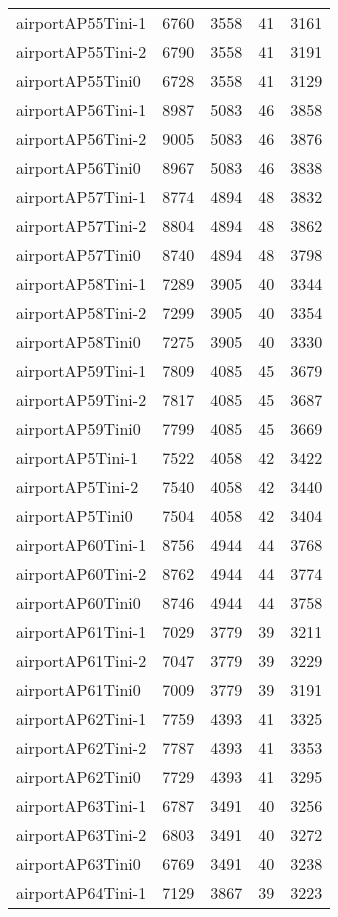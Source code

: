 \begin{longtable}{lrrrr}
airportAP55Tini-1 & 6760 & 3558 & 41 & 3161 \\
airportAP55Tini-2 & 6790 & 3558 & 41 & 3191 \\
airportAP55Tini0 & 6728 & 3558 & 41 & 3129 \\
airportAP56Tini-1 & 8987 & 5083 & 46 & 3858 \\
airportAP56Tini-2 & 9005 & 5083 & 46 & 3876 \\
airportAP56Tini0 & 8967 & 5083 & 46 & 3838 \\
airportAP57Tini-1 & 8774 & 4894 & 48 & 3832 \\
airportAP57Tini-2 & 8804 & 4894 & 48 & 3862 \\
airportAP57Tini0 & 8740 & 4894 & 48 & 3798 \\
airportAP58Tini-1 & 7289 & 3905 & 40 & 3344 \\
airportAP58Tini-2 & 7299 & 3905 & 40 & 3354 \\
airportAP58Tini0 & 7275 & 3905 & 40 & 3330 \\
airportAP59Tini-1 & 7809 & 4085 & 45 & 3679 \\
airportAP59Tini-2 & 7817 & 4085 & 45 & 3687 \\
airportAP59Tini0 & 7799 & 4085 & 45 & 3669 \\
airportAP5Tini-1 & 7522 & 4058 & 42 & 3422 \\
airportAP5Tini-2 & 7540 & 4058 & 42 & 3440 \\
airportAP5Tini0 & 7504 & 4058 & 42 & 3404 \\
airportAP60Tini-1 & 8756 & 4944 & 44 & 3768 \\
airportAP60Tini-2 & 8762 & 4944 & 44 & 3774 \\
airportAP60Tini0 & 8746 & 4944 & 44 & 3758 \\
airportAP61Tini-1 & 7029 & 3779 & 39 & 3211 \\
airportAP61Tini-2 & 7047 & 3779 & 39 & 3229 \\
airportAP61Tini0 & 7009 & 3779 & 39 & 3191 \\
airportAP62Tini-1 & 7759 & 4393 & 41 & 3325 \\
airportAP62Tini-2 & 7787 & 4393 & 41 & 3353 \\
airportAP62Tini0 & 7729 & 4393 & 41 & 3295 \\
airportAP63Tini-1 & 6787 & 3491 & 40 & 3256 \\
airportAP63Tini-2 & 6803 & 3491 & 40 & 3272 \\
airportAP63Tini0 & 6769 & 3491 & 40 & 3238 \\
airportAP64Tini-1 & 7129 & 3867 & 39 & 3223 \\

\end{longtable}
